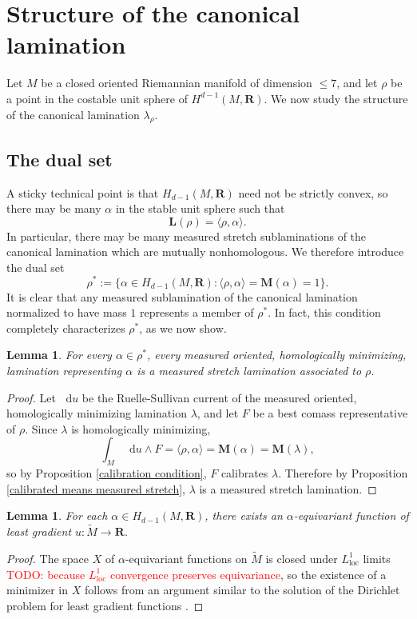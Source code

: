 \documentclass[reqno,11pt]{amsart}
\newcommand{\RR}{\mathbf{R}}
\newcommand*\dif{\mathop{}\!\mathrm{d}}
\newcommand{\Mass}{\mathbf M}
\newcommand{\Comass}{\mathbf L}
\newcommand{\loc}{\mathrm{loc}}
\newtheorem{lemma}[theorem]{Lemma}
\theoremstyle{definition}
\numberwithin{equation}{section}
\newcommand\todo[1]{\textcolor{red}{TODO: #1}}
\begin{document}
\section{Structure of the canonical lamination}\label{canonical structure}
Let $M$ be a closed oriented Riemannian manifold of dimension $\leq 7$, and let $\rho$ be a point in the costable unit sphere of $H^{d - 1}(M, \RR)$.
We now study the structure of the canonical lamination $\lambda_\rho$.

\subsection{The dual set}
A sticky technical point is that $H_{d - 1}(M, \RR)$ need not be strictly convex, so there may be many $\alpha$ in the stable unit sphere such that 
\begin{equation}\label{flats duality}
\Comass(\rho) = \langle \rho, \alpha\rangle.
\end{equation}
In particular, there may be many measured stretch sublaminations of the canonical lamination which are mutually nonhomologous.
We therefore introduce the dual set 
$$\rho^* := \{\alpha \in H_{d - 1}(M, \RR): \langle \rho, \alpha\rangle = \Mass(\alpha) = 1\}.$$
It is clear that any measured sublamination of the canonical lamination normalized to have mass $1$ represents a member of $\rho^*$.
In fact, this condition completely characterizes $\rho^*$, as we now show.

\begin{lemma}\label{homologically minimizing means measured stretch}
For every $\alpha \in \rho^*$, every measured oriented, homologically minimizing, lamination representing $\alpha$ is a measured stretch lamination associated to $\rho$.
\end{lemma}
\begin{proof}
Let $\dif u$ be the Ruelle-Sullivan current of the measured oriented, homologically minimizing lamination $\lambda$, and let $F$ be a best comass representative of $\rho$.
Since $\lambda$ is homologically minimizing,
$$\int_M \dif u \wedge F = \langle \rho, \alpha\rangle = \Mass(\alpha) = \Mass(\lambda),$$
so by Proposition \ref{calibration condition}, $F$ calibrates $\lambda$.
Therefore by Proposition \ref{calibrated means measured stretch}, $\lambda$ is a measured stretch lamination.
\end{proof}

\begin{lemma}\label{existence for least gradient}
For each $\alpha \in H_{d - 1}(M, \RR)$, there exists an $\alpha$-equivariant function of least gradient $u: \tilde M \to \RR$.
\end{lemma}
\begin{proof}
The space $X$ of $\alpha$-equivariant functions on $\tilde M$ is closed under $L^1_\loc$ limits \todo{because $L^1_\loc$ convergence preserves equivariance}, so the existence of a minimizer in $X$ follows from an argument similar to the solution of the Dirichlet problem for least gradient functions \cite[Theorem 1.20]{Giusti77}.
\end{proof}
\end{document}
